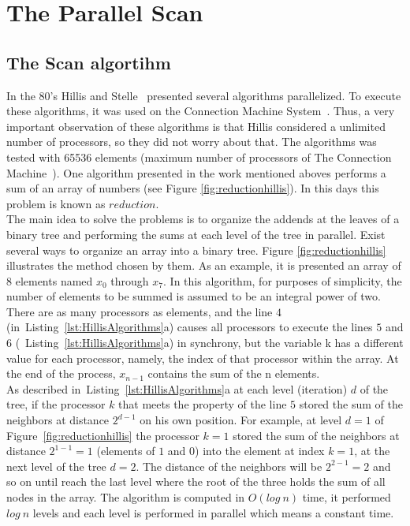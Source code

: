 \documentclass[Ingles]{ic-tese-v1}
\newcommand{\rfig}[1]{Figure~\ref{fig:#1}}
\newcommand{\rlsts}[2]{Listing~\ref{lst:#1}{#2}}
\begin{document}
\chapter{The Parallel Scan}
\label{cap:Scan}

\section{The Scan algortihm}
\label{sec:ScanAlg}

In the 80's Hillis and Stelle~\cite{dataparallel} presented several algorithms 
parallelized. To execute these algorithms, it was used on the Connection Machine System~\cite{themachine}. Thus, a very important observation of these algorithms
is that Hillis considered a unlimited number of processors, so they did not worry about that. The algorithms was tested with 65536 elements (maximum number of processors of The Connection Machine~\cite{themachine}). 
One algorithm presented in the work mentioned aboves performs a sum of an array of numbers (see Figure \ref{fig:reductionhillis}). In this days this problem is known as $reduction$.\\
The main idea to solve the problems is to organize the addends at the leaves of a
binary tree and performing the sums at each level of the tree in parallel. Exist several ways to organize an array into a binary tree. Figure \ref{fig:reductionhillis} illustrates the method chosen by them. As an example, it is presented an array of 8 elements named $x_{0}$ through $x_{7}$. In this algorithm, for purposes of simplicity, the number of elements to be summed is assumed to be an integral power of two. There are as many processors as elements, and the line $4$ (in~\rlsts{HillisAlgorithms}{a}) causes all processors to execute the lines $5$ and $6$ (~\rlsts{HillisAlgorithms}{a}) in synchrony, but the variable k has a different value for each processor, namely, the index of that processor within the array. At the end of the process, $x_{n-1}$ contains the sum of the n elements.\\
As described in~\rlsts{HillisAlgorithms}{a} at each level
(iteration) $d$ of the tree, if the processor $k$ that meets the property of the line $5$
stored the sum of the neighbors at distance $2^{d-1}$ on his own position.
For  example, at  level $d  = 1$  of \rfig{reductionhillis} the processor $k = 1$ stored the sum of the neighbors at distance $2^{1-1} = 1$ (elements of $1$ and $0$) into the element at index $k = 1$, at the  next level of  the tree $d = 2$. The distance of the
neighbors will be $2^{2-1} = 2$ and so on until reach the last level where the root of the three holds the sum of all nodes in the array. The algorithm is computed in $O(log\ n)$ time, it performed $log\ n$ levels and each level is performed in parallel which means a constant time.
\end{document}
